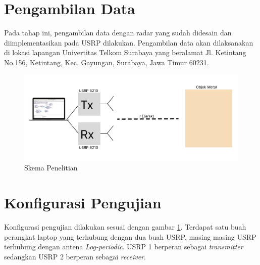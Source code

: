 	
\section{Pengambilan Data}
Pada tahap ini, pengambilan data dengan radar yang sudah didesain dan diimplementasikan pada USRP dilakukan. Pengambilan data akan dilaksanakan di lokasi lapangan Univertitas Telkom Surabaya yang beralamat Jl. Ketintang No.156, Ketintang, Kec. Gayungan, Surabaya, Jawa Timur 60231.


\begin{figure}
	\begin{center}
		\includegraphics[scale=1]{pics/bab3/skema.png}
		\caption{Skema Penelitian}
		\label{img:skema}
	\end{center}
\end{figure}

\section{Konfigurasi Pengujian}
Konfigurasi pengujian dilakukan sesuai dengan gambar \ref{img:skema}. Terdapat satu buah perangkat laptop yang terhubung dengan dua buah USRP, masing masing USRP terhubung dengan antena \textit{Log-periodic}. USRP 1 berperan sebagai \textit{transmitter} sedangkan USRP 2 berperan sebagai \textit{receiver}.
